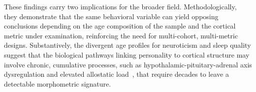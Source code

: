 These findings carry two implications for the broader field. Methodologically, they demonstrate that the same behavioral variable can yield opposing conclusions depending on the age composition of the sample and the cortical metric under examination, reinforcing the need for multi-cohort, multi-metric designs. Substantively, the divergent age profiles for neuroticism and sleep quality suggest that the biological pathways linking personality to cortical structure may involve chronic, cumulative processes, such as hypothalamic-pituitary-adrenal axis dysregulation and elevated allostatic load~\cite{mcewen2006protective}, that require decades to leave a detectable morphometric signature.
